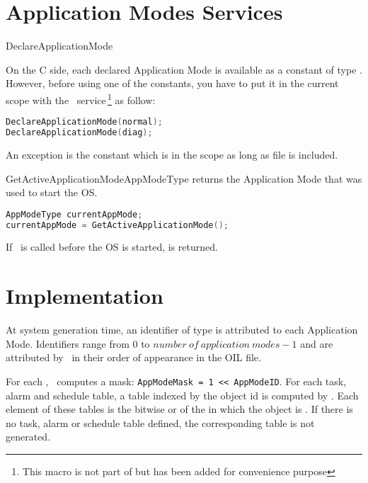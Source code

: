 \section{Application Modes Services}

\begin{service}{DeclareApplicationMode}{}

On the C side, each declared Application Mode is available as a constant of type . However, before using one of the constants, you have to put it in the current scope with the \servicename\ service\,\footnote{This macro is not part of \cite{OSEKOS223} but has been added for convenience purpose}  as follow:

\begin{lstlisting}[language=C]
DeclareApplicationMode(normal);
DeclareApplicationMode(diag);
\end{lstlisting}

An exception is the constant  which is in the scope as long as file  is included.

\end{service}

\begin{service}{GetActiveApplicationMode}{AppModeType}
 returns the Application Mode that was used to start the OS.
\begin{lstlisting}[language=C]
AppModeType currentAppMode;
currentAppMode = GetActiveApplicationMode();
\end{lstlisting}
If \apiname\ is called before the OS is started,  is returned.

\end{service}

\section{Implementation}

At system generation time, an identifier  of type  is attributed to each Application Mode.
Identifiers range from $0$ to $number~of~application~modes - 1$ and are attributed by \goil\ in their order of appearance in the OIL file.

For each , \goil\ computes a mask: \lstinline[language=OIL]{AppModeMask = 1 << AppModeID}.
For each task, alarm and schedule table, a table indexed by the object id is computed by \goil. Each element of these tables is the bitwise or of the  in which the object is . If there is no task, alarm or schedule table defined, the corresponding table is not generated.


